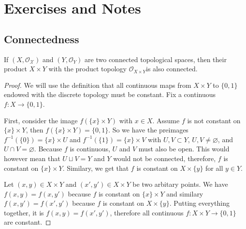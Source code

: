 \newpage
\section{Exercises and Notes}
\subsection{Connectedness}
\begin{thmbox}
    \begin{lemma}
    If \((X, \mathcal{O_X})\) and \((Y, \mathcal{O}_Y)\) are two connected topological spaces, then their product \(X \times Y\) with the product topology \(\mathcal{O}_{X \times Y}\)is also connected.
    \end{lemma}
\end{thmbox}
%
\begin{proof}
    We will use the definition that all continuous maps from \(X \times Y\) to \(\{0, 1\}\) endowed with the discrete topology must be constant. Fix a continuous \(f: X \longrightarrow \{0, 1\}\).
    
    First, consider the image \(f(\{x\} \times Y)\) with \(x \in X\). Assume \(f\) is not constant on \(\{x\} \times Y\), then \(f(\{x\} \times Y) = \{0, 1\}\). So we have the preimages \(f^{-1}(\{0\}) = \{x\} \times U\) and \(f^{-1}(\{1\}) = \{x\} \times V\) with \(U, V \subset Y\), \(U, V \neq \varnothing\), and \(U \cap V = \varnothing\). Because \(f\) is continuous, \(U\) and \(V\) must also be open. This would however mean that \(U \sqcup V = Y\) and \(Y\) would not be connected, therefore, \(f\) is constant on \(\{x\} \times Y\). Similary, we get that \(f\) is constant on \(X \times \{y\}\) for all \(y \in Y\).

    Let \((x, y) \in X \times Y\) and \((x', y') \in X \times Y\) be two arbitary points. We have \(f(x, y) = f(x, y')\) because \(f\) is constant on \(\{x\} \times Y\) and similary \(f(x, y') = f(x', y')\) because \(f\) is constant on \(X \times \{y\}\). Putting everything together, it is \(f(x, y) = f(x',y')\), therefore all continuous \(f: X \times Y \longrightarrow \{0, 1\}\) are constant.
\end{proof}

